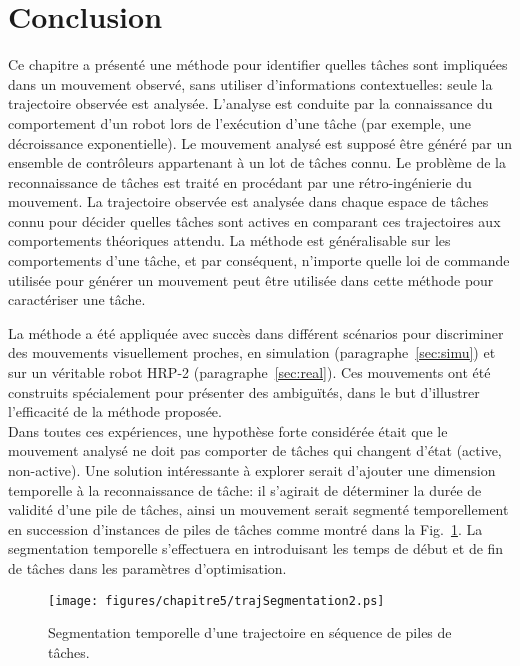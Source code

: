 \section*{Conclusion}
Ce chapitre a présenté une méthode pour identifier quelles t\^aches sont
impliquées dans un mouvement observé, sans utiliser d'informations contextuelles:
seule la trajectoire observée est analysée.
L'analyse est conduite par la connaissance du comportement
d'un robot lors de l'exécution d'une t\^ache (par exemple, une décroissance
exponentielle).
Le mouvement analysé est supposé \^etre généré par un ensemble
de contr\^oleurs appartenant à un lot de t\^aches connu.
Le problème de la reconnaissance de t\^aches est traité en procédant par une rétro-ingénierie
du mouvement.
La trajectoire observée est analysée dans chaque espace de t\^aches connu pour décider
quelles t\^aches sont actives en comparant ces trajectoires aux comportements théoriques attendu.
La méthode est généralisable sur les comportements d'une t\^ache, et par conséquent,
n'importe quelle loi de commande utilisée pour générer un mouvement 
peut \^etre utilisée dans cette méthode pour caractériser une t\^ache.

La méthode a été appliquée avec succès dans différent scénarios pour discriminer des mouvements
visuellement proches, en simulation (paragraphe~\ref{sec:simu}) et sur un véritable 
robot HRP-2 (paragraphe~\ref{sec:real}).
Ces mouvements ont été construits spécialement pour présenter des ambiguïtés, dans le but
d'illustrer l'efficacité de la méthode proposée.\\

Dans toutes ces expériences, une hypothèse forte considérée était que le mouvement
analysé ne doit pas comporter de t\^aches qui changent d'état (active, non-active).
Une solution intéressante à explorer serait d'ajouter une dimension temporelle
à la reconnaissance de t\^ache: il s'agirait de déterminer la durée de validité
d'une pile de t\^aches, ainsi un mouvement serait segmenté temporellement
en succession d'instances de piles de t\^aches comme montré dans la Fig.~\ref{fig:trajSegmentation}.
La segmentation temporelle s'effectuera en
introduisant les temps de début et de fin de t\^aches dans les paramètres d'optimisation.

\begin{figure}[t]
\begin{center}
\texttt{[image: figures/chapitre5/trajSegmentation2.ps]}
\end{center}
\caption{Segmentation temporelle d'une trajectoire en séquence de piles de t\^aches.}
\label{fig:trajSegmentation}
\end{figure}

